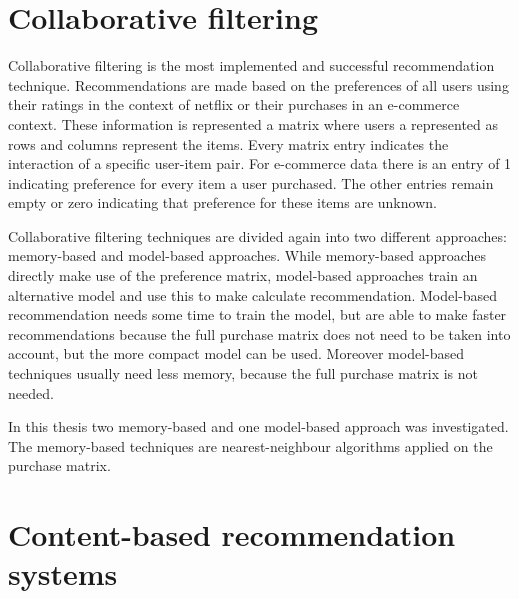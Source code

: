 \documentclass[10pt]{reportMaster}
\begin{document}
\section{Collaborative filtering}
\label{rs_cf}
Collaborative filtering is the most implemented and successful recommendation technique. %
Recommendations are made based on the preferences of all users using their ratings in the context of netflix or their purchases in an e-commerce context.
These information is represented a matrix where users a represented as rows and columns represent the items.
Every matrix entry indicates the interaction of a specific user-item pair.
For e-commerce data there is an entry of 1 indicating preference for every item a user purchased.
The other entries remain empty or zero indicating that preference for these items are unknown. %

Collaborative filtering techniques are divided again into two different approaches: memory-based and model-based approaches.
While memory-based approaches directly make use of the preference matrix, model-based approaches train an alternative model and use this to make calculate recommendation.
Model-based recommendation needs some time to train the model, but are able to make faster recommendations because the full purchase matrix does not need to be taken into account, but the more compact model can be used.
Moreover model-based techniques usually need less memory, because the full purchase matrix is not needed.

In this thesis two memory-based and one model-based approach was investigated.
The memory-based techniques are nearest-neighbour algorithms applied on the purchase matrix.


\section{Content-based recommendation systems} %
\label{rs_cb}
 
\end{document}
